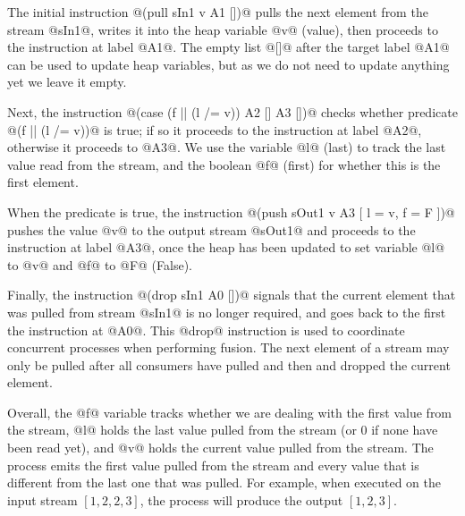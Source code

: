 
The initial instruction @(pull sIn1 v A1 [])@ pulls the next element from the stream @sIn1@, writes it into the heap variable @v@ (value), then proceeds to the instruction at label @A1@. The empty list @[]@ after the target label @A1@ can be used to update heap variables, but as we do not need to update anything yet we leave it empty. 

Next, the instruction @(case (f || (l /= v)) A2 [] A3 [])@ checks whether predicate @(f || (l /= v))@ is true; if so it proceeds to the instruction at label @A2@, otherwise it proceeds to @A3@. We use the variable @l@ (last) to track the last value read from the stream, and the boolean @f@ (first) for whether this is the first element.

When the predicate is true, the instruction @(push sOut1 v A3 [ l = v, f = F ])@ pushes the value @v@ to the output stream @sOut1@ and proceeds to the instruction at label @A3@, once the heap has been updated to set variable @l@ to @v@ and @f@ to @F@ (False). 

Finally, the instruction @(drop sIn1 A0 [])@ signals that the current element that was pulled from stream @sIn1@ is no longer required, and goes back to the first the instruction at @A0@. This @drop@ instruction is used to coordinate concurrent processes when performing fusion. The next element of a stream may only be pulled after all consumers have pulled and then and dropped the current element.

Overall, the @f@ variable tracks whether we are dealing with the first value from the stream, @l@ holds the last value pulled from the stream (or 0 if none have been read yet), and @v@ holds the current value pulled from the stream. The process emits the first value pulled from the stream and every value that is different from the last one that was pulled. For example, when executed on the input stream $[1, 2, 2, 3]$, the process will produce the output $[1, 2, 3]$.

